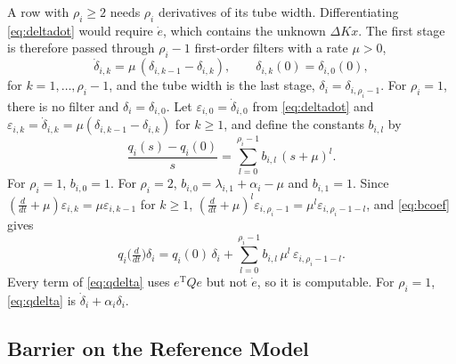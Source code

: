 \documentclass[lettersize,journal]{IEEEtran}
\newcommand{\T}{\mathrm{T}}
\begin{document}
A row with $\rho_i\ge2$ needs $\rho_i$ derivatives of its tube width. Differentiating \eqref{eq:deltadot} would require $\dot e$, which contains the unknown $\Delta Kx$. The first stage is therefore passed through $\rho_i-1$ first-order filters with a rate $\mu>0$,
\begin{equation}
\dot\delta_{i,k}=\mu\,(\delta_{i,k-1}-\delta_{i,k}),\qquad \delta_{i,k}(0)=\delta_{i,0}(0), \label{eq:deltachain}
\end{equation}
for $k=1,\dots,\rho_i-1$, and the tube width is the last stage, $\delta_i=\delta_{i,\rho_i-1}$. For $\rho_i=1$, there is no filter and $\delta_i=\delta_{i,0}$. Let $\varepsilon_{i,0}=\dot\delta_{i,0}$ from \eqref{eq:deltadot} and $\varepsilon_{i,k}=\dot\delta_{i,k}=\mu(\delta_{i,k-1}-\delta_{i,k})$ for $k\ge1$, and define the constants $b_{i,l}$ by
\begin{equation}
\frac{q_i(s)-q_i(0)}{s}=\sum_{l=0}^{\rho_i-1}b_{i,l}\,(s+\mu)^l. \label{eq:bcoef}
\end{equation}
For $\rho_i=1$, $b_{i,0}=1$. For $\rho_i=2$, $b_{i,0}=\lambda_{i,1}+\alpha_i-\mu$ and $b_{i,1}=1$. Since $(\frac{d}{dt}+\mu)\varepsilon_{i,k}=\mu\varepsilon_{i,k-1}$ for $k\ge1$, $(\frac{d}{dt}+\mu)^l\varepsilon_{i,\rho_i-1}=\mu^l\varepsilon_{i,\rho_i-1-l}$, and \eqref{eq:bcoef} gives
\begin{equation}
q_i\big(\tfrac{d}{dt}\big)\delta_i = q_i(0)\,\delta_i+\sum_{l=0}^{\rho_i-1}b_{i,l}\,\mu^l\,\varepsilon_{i,\rho_i-1-l}. \label{eq:qdelta}
\end{equation}
Every term of \eqref{eq:qdelta} uses $e^\T Qe$ but not $\dot e$, so it is computable. For $\rho_i=1$, \eqref{eq:qdelta} is $\dot\delta_i+\alpha_i\delta_i$.

\subsection{Barrier on the Reference Model}
\end{document}
